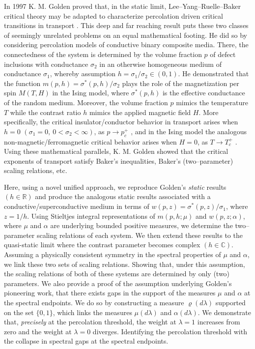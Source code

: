 \documentclass[jmp,graphicx]{revtex4-1}
\begin{document}
  
In 1997 K. M. Golden proved that, in the static limit,
Lee--Yang--Ruelle--Baker critical theory may be adapted to
characterize percolation driven critical transitions in transport  
\cite{Golden:PRL-3935}. This deep and far reaching result puts these
two classes of seemingly unrelated problems on an equal mathematical
footing. He did so by considering percolation models of  
conductive binary composite media. There, the connectedness of the
system is determined by the volume fraction $p$ of defect inclusions
with conductance $\sigma_2$ in an otherwise homogeneous medium of
conductance $\sigma_1$, whereby assumption $h=\sigma_1/\sigma_2\in(0,1)$. He
demonstrated that the function $m(p,h)=\sigma^*(p,h)/\sigma_2$ plays the role of
the magnetization per spin $M(T,H)$ in the Ising model, where
$\sigma^*(p,h)$ is the effective conductance of the random medium. Moreover,
the volume fraction $p$ mimics the temperature $T$ while the contrast
ratio $h$ mimics the applied magnetic field $H$. More specifically,
the critical insulator/conductor behavior in transport arises when
$h=0$ $(\sigma_1=0, \ 0<\sigma_2<\infty)$, as $p\to p_c^+$ \cite{Golden:PRL-3935}, and
in the Ising model the analogous non-magnetic/ferromagnetic critical
behavior arises when $H=0$, as $T\to T_c^+$
\cite{Christensen-2005}. Using these mathematical parallels,
K. M. Golden showed that the critical exponents of transport satisfy
Baker's inequalities, Baker's (two--parameter) scaling relations, etc.

Here, using a novel unified approach, we reproduce Golden's
\emph{static} results $(h\in\mathbb{R})$ and produce the analogous
static results associated with a conductive/superconductive medium in
terms of $w(p,z)=\sigma^*(p,z)/\sigma_1$, where $z=1/h$. Using Stieltjes integral
representations of $m(p,h;\mu)$ and $w(p,z;\alpha)$, where $\mu$ and $\alpha$ are
underlying bounded positive measures, we determine the two--parameter
scaling relations of each system. We then extend these results to the
quasi-static limit where the contrast parameter becomes complex
$(h\in\mathbb{C})$. Assuming a physically consistent symmetry in the
spectral properties of $\mu$ and $\alpha$, we link these two sets of scaling
relations. Showing that, under this assumption, the scaling relations
of both of these systems are determined by only (two) parameters. We
also provide a proof of the assumption underlying Golden's pioneering
work, that there exists gaps in the support of the measures
$\mu$ and $\alpha$ at the spectral endpoints. We do so by constructing a
measure $\varrho(d\lambda)$ supported on the set $\{0,1\}$, which links the measures
$\mu(d\lambda)$ and $\alpha(d\lambda)$. We demonstrate that, \emph{precisely} at the
percolation threshold, the weight at $\lambda=1$ increases from zero and the
weight at $\lambda=0$ diverges. Identifying the percolation threshold with
the collapse in spectral gaps at the spectral endpoints.
\end{document}
